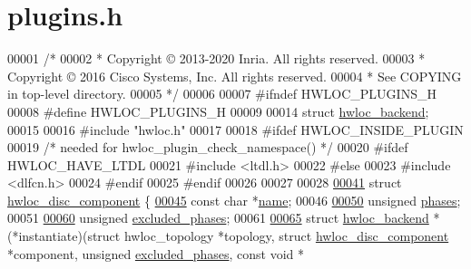 \hypertarget{a00176_source}{}\section{plugins.\+h}
\label{a00176_source}

\begin{DoxyCode}
00001 \textcolor{comment}{/*}
00002 \textcolor{comment}{ * Copyright © 2013-2020 Inria.  All rights reserved.}
00003 \textcolor{comment}{ * Copyright © 2016 Cisco Systems, Inc.  All rights reserved.}
00004 \textcolor{comment}{ * See COPYING in top-level directory.}
00005 \textcolor{comment}{ */}
00006 
00007 \textcolor{preprocessor}{#ifndef HWLOC\_PLUGINS\_H}
00008 \textcolor{preprocessor}{#define HWLOC\_PLUGINS\_H}
00009 
00014 \textcolor{keyword}{struct }\hyperlink{a00374}{hwloc\_backend};
00015 
00016 \textcolor{preprocessor}{#include "hwloc.h"}
00017 
00018 \textcolor{preprocessor}{#ifdef HWLOC\_INSIDE\_PLUGIN}
00019 \textcolor{comment}{/* needed for hwloc\_plugin\_check\_namespace() */}
00020 \textcolor{preprocessor}{#ifdef HWLOC\_HAVE\_LTDL}
00021 \textcolor{preprocessor}{#include <ltdl.h>}
00022 \textcolor{preprocessor}{#else}
00023 \textcolor{preprocessor}{#include <dlfcn.h>}
00024 \textcolor{preprocessor}{#endif}
00025 \textcolor{preprocessor}{#endif}
00026 
00027 
00028 
\hyperlink{a00366}{00041} \textcolor{keyword}{struct }\hyperlink{a00366}{hwloc\_disc\_component} \{
\hyperlink{a00366_a4064c3b5d9213027e87caebef380a840}{00045}   \textcolor{keyword}{const} \textcolor{keywordtype}{char} *\hyperlink{a00366_a4064c3b5d9213027e87caebef380a840}{name};
00046 
\hyperlink{a00366_a61ad3151efa02e3dbad5d919758f9c90}{00050}   \textcolor{keywordtype}{unsigned} \hyperlink{a00366_a61ad3151efa02e3dbad5d919758f9c90}{phases};
00051 
\hyperlink{a00366_acbb9957914dbf7b8f504215aa0c8d3fe}{00060}   \textcolor{keywordtype}{unsigned} \hyperlink{a00366_acbb9957914dbf7b8f504215aa0c8d3fe}{excluded\_phases};
00061 
\hyperlink{a00366_ab133956219739a1032a17131757d1961}{00065}   \textcolor{keyword}{struct }\hyperlink{a00374}{hwloc\_backend} * (*instantiate)(\textcolor{keyword}{struct }hwloc\_topology *topology, \textcolor{keyword}{struct }
      \hyperlink{a00366}{hwloc\_disc\_component} *component, \textcolor{keywordtype}{unsigned} \hyperlink{a00366_acbb9957914dbf7b8f504215aa0c8d3fe}{excluded\_phases}, \textcolor{keyword}{const} \textcolor{keywordtype}{void} *

\end{DoxyCode}
